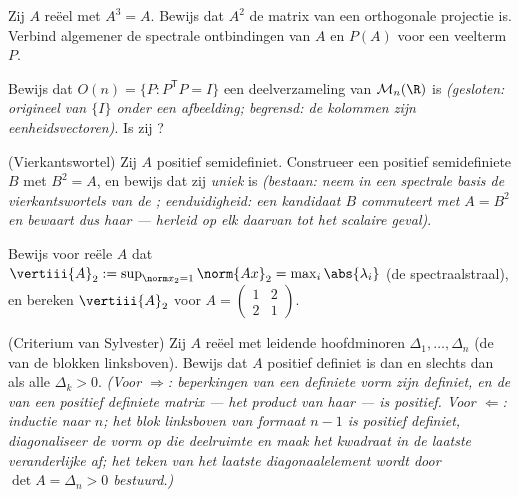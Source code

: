 \begin{exercise}[$\star\star$]\label{exo:b2:quadratic:4}
Zij $A$ reëel  met $A^3 = A$. Bewijs dat $A^2$ de matrix
van een orthogonale projectie is. Verbind algemener de spectrale
ontbindingen van $A$ en $P(A)$ voor een veelterm $P$.
\end{exercise}

\begin{exercise}[$\star\star$]\label{exo:b2:quadratic:5}
Bewijs dat $O(n) = \{P : P^{\mathsf T}P = I\}$ een 
deelverzameling van $\mathcal{M}_n(\R)$ is \emph{(gesloten:
origineel van $\{I\}$ onder een  afbeelding; begrensd: de
kolommen zijn eenheidsvectoren)}. Is zij ?
\end{exercise}

\begin{exercise}[$\star\star$]\label{exo:b2:quadratic:6}
(Vierkantswortel) Zij $A$  positief semidefiniet.
Construeer een  positief semidefiniete $B$ met $B^2 =
A$, en bewijs dat zij \emph{uniek} is \emph{(bestaan: neem in een
spectrale basis de vierkantswortels van de ;
eenduidigheid: een kandidaat $B$ commuteert met $A = B^2$ en
bewaart dus haar  --- herleid op elk daarvan tot het
scalaire geval)}.
\end{exercise}

\begin{exercise}[$\star\star$]\label{exo:b2:quadratic:7}
Bewijs voor reële  $A$ dat $\vertiii{A}_2 :=
\sup_{\norm x_2 = 1}\norm{Ax}_2 = \max_i \abs{\lambda_i}$ (de
spectraalstraal), en bereken $\vertiii{A}_2$ voor $A =
\begin{pmatrix} 1 & 2\\ 2 & 1\end{pmatrix}$.
\end{exercise}

\begin{exercise}[$\star\star\star$]\label{exo:b2:quadratic:8}
(Criterium van Sylvester) Zij $A$ reëel  met leidende
hoofdminoren $\Delta_1, \dots, \Delta_n$ (de  van de
blokken linksboven). Bewijs dat $A$ positief definiet is dan en
slechts dan als alle $\Delta_k > 0$. \emph{(Voor $\Rightarrow$:
beperkingen van een definiete vorm zijn definiet, en de 
van een positief definiete matrix --- het product van haar
 --- is positief. Voor $\Leftarrow$: inductie naar $n$;
het blok linksboven van formaat $n-1$ is positief definiet,
diagonaliseer de vorm op die deelruimte en maak het kwadraat in de
laatste veranderlijke af; het teken van het laatste
diagonaalelement wordt door $\det A = \Delta_n > 0$ bestuurd.)}
\end{exercise}

